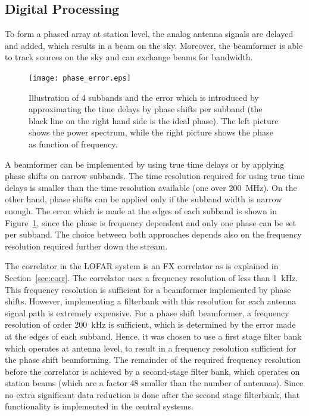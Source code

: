 \documentclass[journal]{IEEEtran}
\begin{document}
\subsection{Digital Processing}

To form a phased array at station level, the analog antenna signals are delayed
and added, which results in a beam on the sky.
Moreover, the beamformer is able to track sources on the sky and can exchange
beams for bandwidth. 

\begin{figure}
\begin{center}
\texttt{[image: phase\_error.eps]}
\end{center}
\caption{Illustration of 4 subbands and the error which is introduced by approximating the time delays by phase shifts per subband (the black line on the right hand side is the ideal phase). The left picture shows the power spectrum, while the right picture shows the phase as function of frequency.}
\label{fig:phasebeamf}
\end{figure}

A beamformer can be implemented by using true time delays or by applying phase
shifts on narrow subbands.
The time resolution required for using true time delays is smaller than the
time resolution available (one over 200~MHz).
On the other hand, phase shifts can be applied only if the subband width is
narrow enough.
The error which is made at the edges of each subband is shown in
Figure~\ref{fig:phasebeamf}, since the phase is frequency dependent and only
one phase can be set per subband.
The choice between both approaches depends also on the frequency resolution
required further down the stream.

The correlator in the LOFAR system is an FX correlator as is explained in
Section~\ref{sec:corr}.
The correlator uses a frequency resolution of less than 1~kHz.
This frequency resolution is sufficient for a beamformer implemented by
phase shifts.
However, implementing a filterbank with this resolution for each antenna
signal path is extremely expensive.
For a phase shift beamformer, a frequency resolution of order 200~kHz is
sufficient, which is determined by the error made at the edges of each subband.
Hence, it was chosen to use a first stage filter bank which operates at antenna
level, to result in a frequency resolution sufficient for the phase shift
beamforming.
The remainder of the required frequency resolution before the correlator is
achieved by a second-stage filter bank, which operates on station beams
(which are a factor 48 smaller than the number of antennas).
Since no extra significant data reduction is done after the second stage
filterbank, that functionality is implemented in the central systems.
\end{document}
